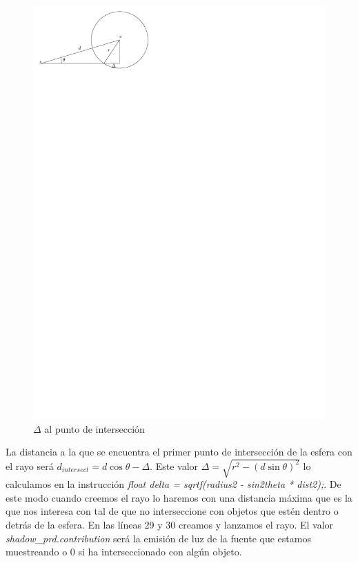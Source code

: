 \begin{figure}[h]
\centering
\includegraphics[scale=1.0]{sample_esfera.pdf}
\caption{  $\Delta $ al punto de intersección}
\end{figure}

La distancia a la que se encuentra el primer punto de intersección de la esfera con el rayo será $d_{intersect} = d \cos\theta - \Delta $. Este valor $\Delta = \sqrt{r^2 - (d\sin\theta)^2}$ lo calculamos en la instrucción \emph{float delta = sqrtf(radius2 - sin2theta * dist2);}. De este modo cuando creemos el rayo lo haremos con una distancia máxima que es la que nos interesa con tal de que no interseccione con objetos que estén dentro o detrás de la esfera. En las líneas 29 y 30 creamos y lanzamos el rayo. El valor \emph{shadow\_prd.contribution} será la emisión de luz de la fuente que estamos muestreando o $0$ si ha interseccionado con algún objeto.

